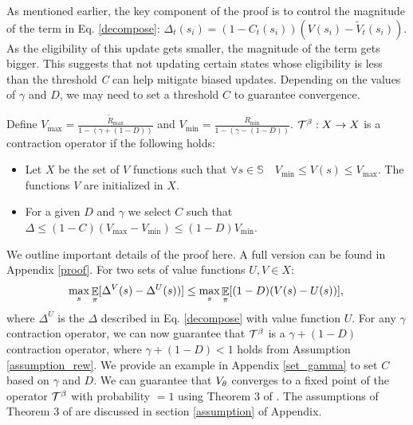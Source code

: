 As mentioned earlier, the key component of the proof is to control the magnitude of the term in Eq. \ref{decompose}: 
$\Delta_t(s_i) = (1-C_t(s_i))(V(s_i) - \widetilde{V}_t(s_i))$. As the eligibility of this update gets smaller, the magnitude of the term gets bigger. This suggests that not updating certain states whose eligibility is less than the threshold \emph{C} can help mitigate biased updates.
Depending on the values of $\gamma$ and $D$, we may need to set a threshold $C$ to guarantee convergence.
\begin{theorem}
\label{contraction_theorem}
Define $V_{\max} = \frac{\widetilde{R}_{\max}}{1-(\gamma+(1-D))}$ and $V_{\min} = \frac{R_{\min}}{1-(\gamma-(1-D))}$. $\mathcal{T}^{\beta}: X \rightarrow X$ is a contraction operator if the following holds:
\begin{itemize}
    \item Let $X$ be the set of $V$ functions such that $\forall s \in \mathbb{S} \quad  V_{\min} \leq V(s) \leq V_{\max}$.  The functions $V$ are initialized in $X$.
    \item For a given $D$ and $\gamma$ we select $C$ such that $\Delta \leq (1-C)(V_{\max}-V_{\min}) \leq (1-D)V_{\min}$.
\end{itemize}
\end{theorem}
We outline important details of the proof here. A full version can be found in Appendix \ref{proof}. For two sets of value functions $U,V \in X$:
\begin{equation}
    \max_{s}\mathop{\mathbb{E}}_{\pi}[ \Delta^V(s) -  \Delta^U(s))] \leq \max_{s}\mathop{\mathbb{E}}_{\pi}[(1-D)(V(s)-U(s))],\\
\end{equation}
where $\Delta^U$ is the $\Delta$ described in Eq. \ref{decompose} with value function $U$. For any $\gamma$ contraction operator, we can now guarantee that $\mathcal{T}^{\beta}$ is a $\gamma + (1-D)$ contraction operator, where $\gamma + (1-D) < 1$ holds from Assumption \ref{assumption_rew}. We provide an example in Appendix \ref{set_gamma} to set $C$ based on $\gamma$ and $D$.
We can guarantee that $V_{\theta}$ converges to a fixed point of the operator $\mathcal{T}^{\beta}$ with probability $=1$ using Theorem 3 of \cite{tsitsiklis1994asynchronous}. The assumptions of Theorem 3 of \cite{tsitsiklis1994asynchronous} are discussed in section \ref{assumption} of Appendix.


